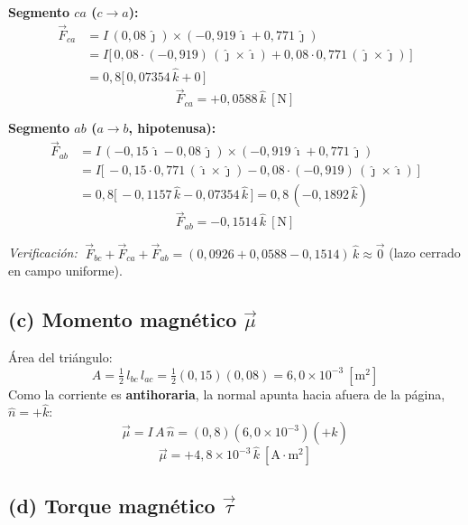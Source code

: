 \documentclass[12pt]{article}
\begin{document}
\noindent\textbf{Segmento $ca$ ($c\to a$):}
\begin{align*}
    \vec{F}_{ca} &= I\,(0{,}08\,\hat{\jmath})\times(-0{,}919\,\hat{\imath}+0{,}771\,\hat{\jmath}) \\
                 &= I\big[\,0{,}08\cdot(-0{,}919)\,(\hat{\jmath}\times\hat{\imath})
                    + 0{,}08\cdot0{,}771\,(\hat{\jmath}\times\hat{\jmath})\,\big] \\
                 &= 0{,}8\big[\,0{,}07354\,\hat{k} + 0\,\big]
\end{align*}
\[
    \boxed{\vec{F}_{ca} = +0{,}0588\,\hat{k}\ [\text{N}]}
\]

\noindent\textbf{Segmento $ab$ ($a\to b$, hipotenusa):}
\begin{align*}
    \vec{F}_{ab} &= I\,(-0{,}15\,\hat{\imath}-0{,}08\,\hat{\jmath})\times(-0{,}919\,\hat{\imath}+0{,}771\,\hat{\jmath}) \\
                 &= I\big[\,-0{,}15\cdot0{,}771\,(\hat{\imath}\times\hat{\jmath})
                    - 0{,}08\cdot(-0{,}919)\,(\hat{\jmath}\times\hat{\imath})\,\big] \\
                 &= 0{,}8\big[\,-0{,}1157\,\hat{k} - 0{,}07354\,\hat{k}\,\big]
                  = 0{,}8\,(-0{,}1892\,\hat{k})
\end{align*}
\[
    \boxed{\vec{F}_{ab} = -0{,}1514\,\hat{k}\ [\text{N}]}
\]

\noindent\textit{Verificaci\'on:}
$\;\vec{F}_{bc}+\vec{F}_{ca}+\vec{F}_{ab}
= (0{,}0926+0{,}0588-0{,}1514)\,\hat{k} \approx \vec{0}$ \quad(lazo cerrado en campo uniforme).

\subsection*{(c) Momento magn\'etico $\vec{\mu}$}

\'Area del tri\'angulo:
\[
    A = \tfrac{1}{2}\,l_{bc}\,l_{ac} = \tfrac{1}{2}(0{,}15)(0{,}08) = 6{,}0\times10^{-3}\ [\text{m}^2]
\]
Como la corriente es \textbf{antihoraria}, la normal apunta hacia afuera de la p\'agina,
$\hat{n}=+\hat{k}$:
\[
    \vec{\mu} = I\,A\,\hat{n} = (0{,}8)(6{,}0\times10^{-3})(+\hat{k})
\]
\[
    \boxed{\vec{\mu} = +4{,}8\times10^{-3}\,\hat{k}\ [\text{A}\cdot\text{m}^2]}
\]

\subsection*{(d) Torque magn\'etico $\vec{\tau}$}
\end{document}
